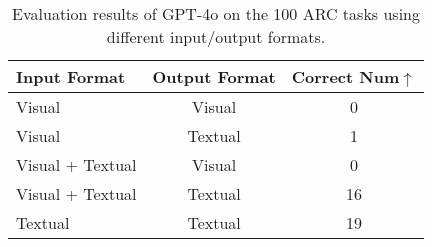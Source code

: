 
\begin{table}[tb]
\small
\centering
\setlength{\tabcolsep}{2mm}
\begin{tabular}{lcc}
\toprule
\textbf{Input Format} & \textbf{Output Format} 
& \textbf{Correct Num}$\uparrow$ \\
\midrule
Visual & Visual & 0 \\
Visual & Textual & 1\\
Visual + Textual & Visual & 0\\
Visual + Textual & Textual & 16 \\
Textual & Textual & 19 \\

\bottomrule
\end{tabular}
\caption{Evaluation results of GPT-4o on the 100 ARC tasks using different input/output formats.}

\vspace{-0.1in}
\label{tab:different format}
\end{table}


